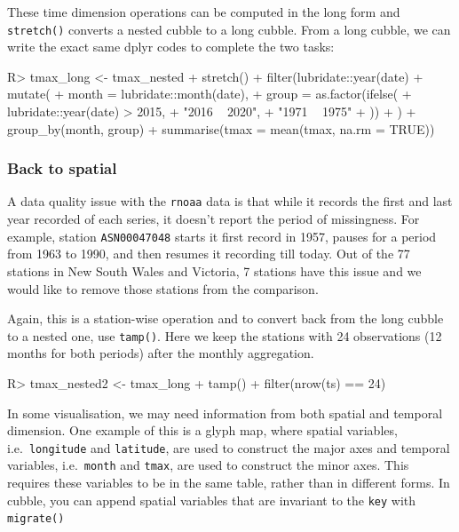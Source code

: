 \documentclass[
]{jss}
\begin{document}
These time dimension operations can be computed in the long form and
\texttt{stretch()} converts a nested cubble to a long cubble. From a
long cubble, we can write the exact same dplyr codes to complete the two
tasks:

\begin{CodeChunk}
\begin{CodeInput}
R> tmax_long <- tmax_nested %
+   stretch() %
+   filter(lubridate::year(date) %
+   mutate(
+     month = lubridate::month(date),
+     group = as.factor(ifelse(
+       lubridate::year(date) > 2015,
+       "2016 ~ 2020",
+       "1971 ~ 1975"
+     ))
+   ) %
+   group_by(month, group) %
+   summarise(tmax = mean(tmax, na.rm = TRUE))
\end{CodeInput}
\end{CodeChunk}

\hypertarget{back-to-spatial}{%
\subsubsection{Back to spatial}\label{back-to-spatial}}

A data quality issue with the \texttt{rnoaa} data is that while it
records the first and last year recorded of each series, it doesn't
report the period of missingness. For example, station
\texttt{ASN00047048} starts it first record in 1957, pauses for a period
from 1963 to 1990, and then resumes it recording till today. Out of the
77 stations in New South Wales and Victoria, 7 stations have this issue
and we would like to remove those stations from the comparison.

Again, this is a station-wise operation and to convert back from the
long cubble to a nested one, use \texttt{tamp()}. Here we keep the
stations with 24 observations (12 months for both periods) after the
monthly aggregation.

\begin{CodeChunk}
\begin{CodeInput}
R> tmax_nested2 <- tmax_long %
+   tamp() %
+   filter(nrow(ts) == 24)
\end{CodeInput}
\end{CodeChunk}

In some visualisation, we may need information from both spatial and
temporal dimension. One example of this is a glyph map, where spatial
variables, i.e.~\texttt{longitude} and \texttt{latitude}, are used to
construct the major axes and temporal variables, i.e.~\texttt{month} and
\texttt{tmax}, are used to construct the minor axes. This requires these
variables to be in the same table, rather than in different forms. In
cubble, you can append spatial variables that are invariant to the
\texttt{key} with \texttt{migrate()}
\end{document}
